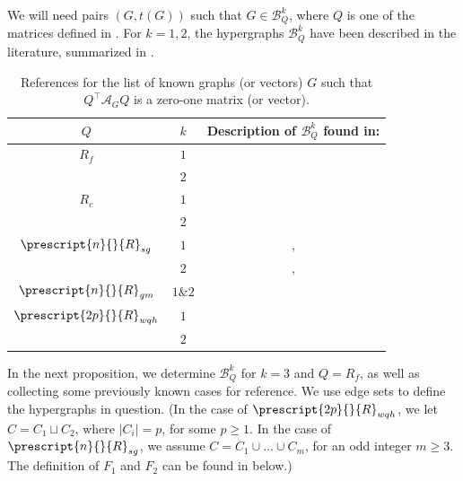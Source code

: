 \documentclass[12pt]{article}
\numberwithin{equation}{section}
\theoremstyle{definition}
\newcommand{\ev}[1]{( #1 )}
\begin{document}
We will need pairs $\ev{ G, t\ev{G}}$ such that $G\in \mathcal{B}^{k}_Q$, where $Q$ is one of the matrices defined in . For $k=1,2$, the hypergraphs $\mathcal{B}^{k}_Q$ have been described in the literature, summarized in . 
\begin{table}[h!]
\centering
\begin{tabular}{ | c | c | c |}
\hline
$Q$ & $k$ & Description of $\mathcal{B}^{k}_Q$ found in: \\[2mm]
\hline
$R_f$ & $1$ & \cite[Lemma 7, p.~9]{abiad_haemers} \\[1mm] 
& $2$  & \cite[Lemma 8, p.~10]{abiad_haemers}  \\ [1mm]
\hline
$R_c$   & $1$ & \cite[Lemma 30, p.~22]{abiad_berg_simoens}\\ [1mm] 
& $2$ & \cite[Table 2, p.~23]{abiad_berg_simoens}\\ [1mm] 
\hline
$\prescript{n}{}{R}_{sg} $  & $1$ & \cite[Lemma 6, p.~7]{abiad_berg_simoens}, \cite[Theorem 6.1, p.~15]{mao_wang_liu_qiu_2023} \\ [1mm] 
& $2$ & \cite[Theorems 5,7,8]{abiad_berg_simoens}, \cite[Theorem 4.1, p.~11]{mao_wang_liu_qiu_2023}  \\ [1mm] 
\hline
$\prescript{n}{}{R}_{gm}$ & $1 \& 2$ & \cite[Theorem 1.1, p.~156]{wang_qui_hu_2019} \\[1mm] \hline
$\prescript{2p}{}{R}_{wqh} $ & $1$ & \cite[Theorem 3.4, p.~163]{wang_qui_hu_2019} \\[1mm]
& $2$  &  \cite[Theorem 3.1, p.~160]{wang_qui_hu_2019} \\ [1mm] 
\hline
\end{tabular}
\caption{References for the list of known graphs (or vectors) $G$ such that $Q^\top \mathcal{A}_G Q$ is a zero-one matrix (or vector). }
\label{table:exhaustive_list}
\end{table}

In the next proposition, we determine $\mathcal{B}^{k}_Q$ for $k=3$ and $Q = R_f$, as well as collecting some previously known cases for reference. We use edge sets to define the hypergraphs in question. (In the case of $\prescript{2p}{}{R}_{wqh}$, we let $C = C_1 \sqcup C_2$, where $|C_i| = p$, for some $p\geq 1$. In the case of $\prescript{n}{}{R}_{sg}$, we assume $C = C_1 \cup \ldots \cup C_{m}$, for an odd integer $m\geq 3$. The definition of $F_1$ and $F_2$ can be found in  below.)
\end{document}
